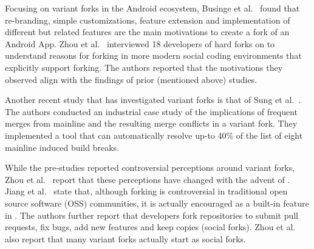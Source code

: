 
Focusing on variant forks in the Android ecosystem, Businge et al.~\cite{businge2018appfamilies} found that re-branding, simple customizations, feature extension and implementation of different but related features are the main motivations to create a fork of an Android App.
Zhou et al.~\cite{Zhou:2020} interviewed 18 developers of hard forks on \gh to understand reasons for forking in more modern social coding environments that explicitly support forking. The authors reported that the motivations they observed align with the findings of prior (mentioned above) studies.

Another recent study that has investigated variant forks is that of Sung et al.~\cite{sung:ICSE:2020}. The authors conducted an industrial case study of the implications of frequent merges from mainline and the resulting merge conflicts in a variant fork. They implemented a tool that can automatically resolve up-to 40\% of the list of eight mainline induced build breaks.

While the pre-\gh studies reported controversial perceptions around variant forks, Zhou et al.~\cite{Zhou:2020} report that these perceptions have changed with the advent of \gh. Jiang et al.~\cite{Lo:2017} state that, although forking is controversial in traditional open source software (OSS) communities, it is actually encouraged as a built-in feature in \gh. The authors further report that developers fork repositories to submit pull requests, fix bugs, add new features and keep copies (social forks).
Zhou et al.~\cite{Zhou:2020} also report that many variant forks actually start as social forks.

